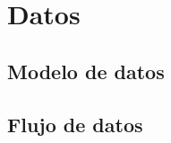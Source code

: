 \chapter{Datos} \label{a.datos}

\section{Modelo de datos} \label{a.datos.modelo}

\section{Flujo de datos} \label{a.datos.flujo}

